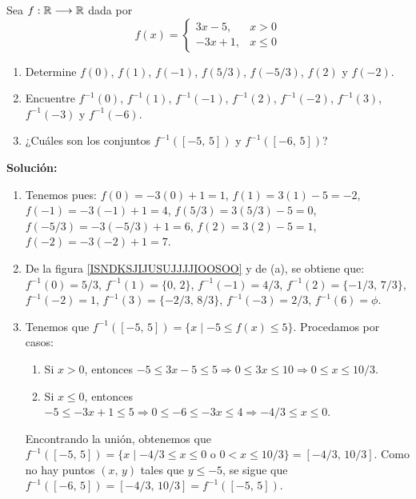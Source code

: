 \begin{myexample}
    Sea $f: \RR \longrightarrow \RR$ dada por
    $$f(x) = \left\{ \begin{array}{rl}
        3x-5, & x>0 \\
        -3x+1, & x \leq 0
    \end{array} \right.$$
    \begin{enumerate}[label=\alph*)]
        \item Determine $f(0)$, $f(1)$, $f(-1)$, $f(5/3)$, $f(-5/3)$, $f(2)$ y $f(-2)$.
        \item Encuentre $f^{-1}(0)$, $f^{-1}(1)$, $f^{-1}(-1)$, $f^{-1}(2)$, $f^{-1}(-2)$, $f^{-1}(3)$, $f^{-1}(-3)$ y $f^{-1}(-6)$.
        \item ¿Cuáles son los conjuntos $f^{-1}([-5, \, 5])$ y $f^{-1}([-6, \, 5])$?
    \end{enumerate}
    \textbf{\color{jblueleft}Solución:}
    \begin{enumerate}[label=\alph*)]
        \item Tenemos pues: $f(0) = -3(0) + 1 = 1$, $f(1) = 3(1) - 5 = -2$, $f(-1) = -3(-1) + 1 = 4$, $f(5/3) = 3(5/3) - 5 = 0$, $f(-5/3) = -3(-5/3) + 1 = 6$, $f(2) = 3(2) - 5 = 1$, $f(-2) = -3(-2) + 1 = 7$.
        \item De la figura \ref{ISNDKSJIJUSUJJJJIOOSOO} y de (a), se obtiene que: $f^{-1}(0) = 5/3$, $f^{-1}(1) = \{0, \, 2\}$, $f^{-1}(-1) = 4/3$, $f^{-1}(2) = \{-1/3, \, 7/3 \}$, $f^{-1}(-2) = 1$, $f^{-1}(3) = \{-2/3, \, 8/3\}$, $f^{-1}(-3) = 2/3$, $f^{-1}(6) = \phi$.
        \item Tenemos que $f^{-1}([-5, \, 5]) = \{ x \mid -5 \leq f(x) \leq 5 \}$. Procedamos por casos:
        \begin{enumerate}[label=\roman*)]
            \item Si $x>0$, entonces $-5 \leq 3x-5 \leq 5 \Longrightarrow 0 \leq 3x \leq 10 \Longrightarrow 0 \leq x \leq 10/3$.
            \item Si $x \leq 0$, entonces $-5 \leq -3x + 1 \leq 5 \Longrightarrow 0 \leq -6 \leq -3x \leq 4 \Longrightarrow -4/3 \leq x \leq 0$.
        \end{enumerate}
        Encontrando la unión, obtenemos que $f^{-1}([-5, \, 5]) = \{ x \mid -4/3 \leq x \leq 0 \text{ o } 0 < x \leq 10/3 \} = [-4/3, \, 10/3]$. Como no hay puntos $(x, \, y)$ tales que $y \leq -5$, se sigue que $f^{-1}([-6, \, 5]) = [-4/3, \, 10/3] = f^{-1}([-5, \, 5])$.
    \end{enumerate}
    \begin{center}

\end{center}
\end{myexample}
